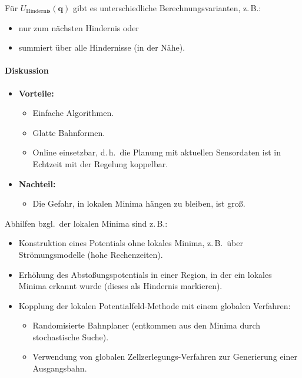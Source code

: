 \documentclass[a4paper, 11pt, accentcolor = tud3b]{tudreport}
\renewcommand{\vec}[1]{\boldsymbol{#1}}
\renewcommand{\dh}{d.\,h.~}
\newcommand{\bzgl}{bzgl.~}
\newcommand{\zB}{z.\,B.~}
\begin{document}
					Für \( U_\text{Hindernis}(\vec{q}) \) gibt es unterschiedliche Berechnungsvarianten, z.\,B.:
					\begin{itemize}
						\item nur zum nächsten Hindernis oder
						\item summiert über alle Hindernisse (in der Nähe).
					\end{itemize}
				
				\paragraph{Diskussion}
					\begin{itemize}
						\item \textbf{Vorteile:}
							\begin{itemize}
								\item Einfache Algorithmen.
								\item Glatte Bahnformen.
								\item Online einsetzbar, \dh die Planung mit aktuellen Sensordaten ist in Echtzeit mit der Regelung koppelbar.
							\end{itemize}
						\item \textbf{Nachteil:}
							\begin{itemize}
								\item Die Gefahr, in lokalen Minima hängen zu bleiben, ist groß.
							\end{itemize}
					\end{itemize}
				
					Abhilfen \bzgl der lokalen Minima sind z.\,B.:
					\begin{itemize}
						\item Konstruktion eines Potentials ohne lokales Minima, \zB über Strömungsmodelle (hohe Rechenzeiten).
						\item Erhöhung des Abstoßungspotentials in einer Region, in der ein lokales Minima erkannt wurde (dieses als Hindernis markieren).
						\item Kopplung der lokalen Potentialfeld-Methode mit einem globalen Verfahren:
							\begin{itemize}
								\item Randomisierte Bahnplaner (entkommen aus den Minima durch stochastische Suche).
								\item Verwendung von globalen Zellzerlegungs-Verfahren zur Generierung einer Ausgangsbahn.
							\end{itemize}
					\end{itemize}
\end{document}
